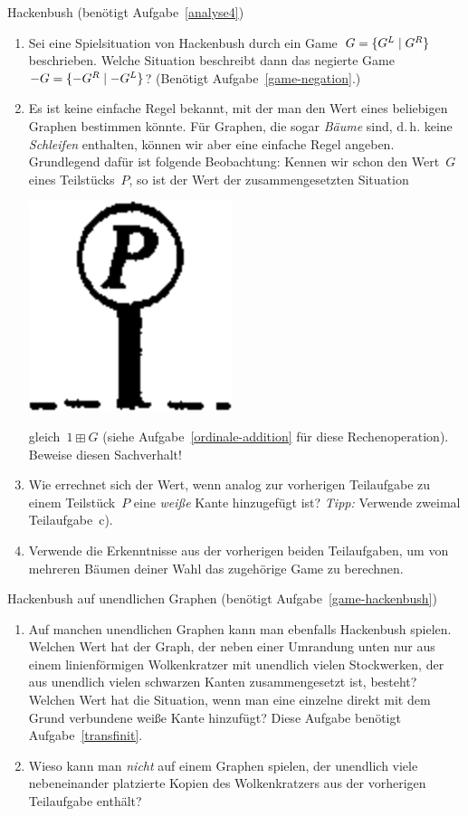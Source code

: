 \documentclass{../zirkelblatt}
\begin{document}
\begin{aufgabe}{Hackenbush (benötigt Aufgabe~\ref{analyse4})}
\begin{enumerate}
\begin{center}
\end{center}
\item Sei eine Spielsituation von Hackenbush durch ein Game~$G =
\{ G^L \mathrel{|} G^R \}$ beschrieben.
Welche Situation beschreibt dann das negierte Game~$-G = \{ -G^R \mathrel{|} -G^L \}$?
(Benötigt Aufgabe~\ref{game-negation}.)
\item Es ist keine einfache Regel bekannt, mit der man den Wert eines
beliebigen Graphen bestimmen könnte. Für Graphen, die sogar \emph{Bäume} sind,
d.\,h. keine \emph{Schleifen} enthalten, können wir aber eine einfache Regel
angeben. Grundlegend dafür ist folgende Beobachtung: Kennen wir schon den
Wert~$G$ eines Teilstücks~$P$, so ist der Wert
der zusammengesetzten Situation
\begin{center}
\includegraphics[scale=0.3]{hackenbush-beispiele-3}
\end{center}
gleich~$1 \boxplus G$ (siehe Aufgabe~\ref{ordinale-addition} für diese
Rechenoperation). Beweise diesen Sachverhalt!
\item Wie errechnet sich der Wert, wenn analog zur vorherigen Teilaufgabe
zu einem Teilstück~$P$ eine \emph{weiße} Kante hinzugefügt ist? \emph{Tipp:}
Verwende zweimal Teilaufgabe~c).
\item Verwende die Erkenntnisse aus der vorherigen beiden Teilaufgaben, um von
mehreren Bäumen deiner Wahl das zugehörige Game zu berechnen.
\end{enumerate}
\end{aufgabe}

\begin{aufgabe}{Hackenbush auf unendlichen Graphen (benötigt
Aufgabe~\ref{game-hackenbush})}
\label{game-hackenbush-infinite}
\begin{enumerate}
\item Auf manchen unendlichen Graphen kann man ebenfalls Hackenbush spielen.
Welchen Wert hat der Graph, der neben einer Umrandung unten nur aus einem
linienförmigen Wolkenkratzer mit unendlich vielen Stockwerken, der aus
unendlich vielen schwarzen Kanten zusammengesetzt ist, besteht? Welchen Wert
hat die Situation, wenn man eine einzelne direkt mit dem Grund verbundene weiße
Kante hinzufügt? Diese Aufgabe benötigt Aufgabe~\ref{transfinit}.
\item Wieso kann man \emph{nicht} auf einem Graphen spielen, der unendlich
viele nebeneinander platzierte Kopien des Wolkenkratzers aus der vorherigen
Teilaufgabe enthält?
\end{enumerate}
\end{aufgabe}
\end{document}

